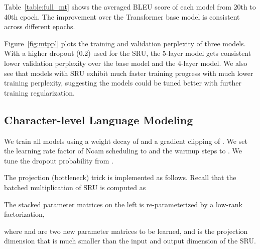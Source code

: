 \documentclass[11pt,a4paper]{article}
\begin{document}
Table~\ref{table:full_mt} shows the averaged BLEU score of each model from 20th to 40th epoch.
The improvement over the Transformer base model is consistent across different epochs.

Figure~\ref{fig:mtppl} plots the training and validation perplexity of three models. 
With a higher dropout (0.2) used for the SRU, the 5-layer model gets consistent lower validation perplexity over the base model and the 4-layer model.
We also see that models with SRU exhibit much faster training progress with much lower training perplexity, suggesting the models could be tuned better with further training regularization.

\subsection{Character-level Language Modeling}
We train all models using a weight decay of  and a gradient clipping of .
We set the learning rate factor of Noam scheduling to  and the warmup steps to .
We tune the dropout probability from .

The projection (bottleneck) trick is implemented as follows.
Recall that the batched multiplication of SRU is computed as

The stacked parameter matrices on the left is re-parameterized by a low-rank factorization,

where  and  are two new parameter matrices to be learned, and  is the projection dimension that is much smaller than the input and output dimension of the SRU. 
\end{document}
